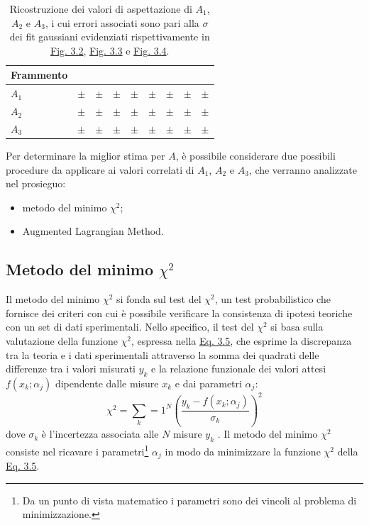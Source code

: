 \documentclass[12pt,a4paper,twoside]{report}
\begin{document}
	\begin{table}[H]
		\begin{minipage}{\textwidth}
			\centering
			\begin{tabular}{ |M{2.0cm}||M{2.0cm}|M{2.0cm}|M{2.0cm}|M{2.0cm}|M{2.0cm}|M{2.0cm}|M{2.0cm}|M{2.0cm}| }
				\hline
				Frammento &&&&&&&&\\
				\hline
				$A_1$& $\pm$& $\pm$ &$\pm$ &$\pm$& $\pm$& $\pm$& $\pm$& $\pm$ \\
				\hline
				$A_2$& $\pm$& $\pm$ &$\pm$ &$\pm$& $\pm$& $\pm$& $\pm$& $\pm$ \\
				\hline
				$A_3$& $\pm$& $\pm$ &$\pm$ &$\pm$& $\pm$& $\pm$& $\pm$& $\pm$ \\
				\hline
			\end{tabular}
		\end{minipage}
		\caption{Ricostruzione dei valori di aspettazione di $A_1$, $A_2$ e $A_3$, i cui errori associati sono pari alla $\sigma$ dei fit gaussiani evidenziati rispettivamente in \hyperref[fig:a1]{Fig. 3.2}, \hyperref[fig:a2]{Fig. 3.3} e \hyperref[fig:a3]{Fig. 3.4}.}
		\label{tab:mass_numbers}
	\end{table}
	Per determinare la miglior stima per $A$, è possibile considerare due possibili procedure da applicare ai valori correlati di $A_1$, $A_2$ e $A_3$, che verranno analizzate nel prosieguo:
	\begin{itemize}
		\item metodo del minimo $\chi^2$;
		\item Augmented Lagrangian Method.
	\end{itemize}
	
	\subsection{Metodo del minimo \texorpdfstring{$\chi^2$}{chi}}
	Il metodo del minimo $\chi^2$ si fonda sul test del $\chi^2$, un test probabilistico che fornisce dei criteri con cui è possibile verificare la consistenza di ipotesi teoriche con un set di dati sperimentali. Nello specifico, il test del $\chi^2$ si basa sulla valutazione della funzione $\chi^2$, espressa nella \hyperref[eq:chi_square_method]{Eq. 3.5}, che esprime la discrepanza tra la teoria e i dati sperimentali attraverso la somma dei quadrati delle differenze tra i valori misurati $y_k$ e la relazione funzionale dei valori attesi $f\left(x_k;\alpha_j\right)$ dipendente dalle misure $x_k$ e dai parametri $\alpha_j$:
	\begin{equation}
		\chi^2=\sum_k=1^N\left(\frac{y_k-f\left(x_k;\alpha_j\right)}{\sigma_k}\right)^2
		\label{eq:chi_square_method}
	\end{equation}
	dove $\sigma_k$ è l'incertezza associata alle $N$ misure $y_k$ \cite{Fornasini2008}. Il metodo del minimo $\chi^2$ consiste nel ricavare i parametri\footnote{Da un punto di vista matematico i parametri sono dei vincoli al problema di minimizzazione.} $\alpha_j$ in modo da minimizzare la funzione $\chi^2$ della \hyperref[eq:chi_square_method]{Eq. 3.5}.
	
\end{document}
